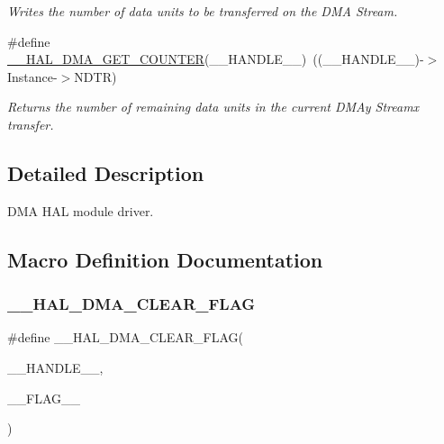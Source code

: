 \begin{DoxyCompactItemize}
\begin{DoxyCompactList}\small\item\em Writes the number of data units to be transferred on the D\+MA Stream. \end{DoxyCompactList}\item 
\#define \mbox{\hyperlink{group___d_m_a_ga082d691311bac96641dc35a17cfe8e63}{\+\_\+\+\_\+\+H\+A\+L\+\_\+\+D\+M\+A\+\_\+\+G\+E\+T\+\_\+\+C\+O\+U\+N\+T\+ER}}(\+\_\+\+\_\+\+H\+A\+N\+D\+L\+E\+\_\+\+\_\+)~((\+\_\+\+\_\+\+H\+A\+N\+D\+L\+E\+\_\+\+\_\+)-\/$>$Instance-\/$>$N\+D\+TR)
\begin{DoxyCompactList}\small\item\em Returns the number of remaining data units in the current D\+M\+Ay Streamx transfer. \end{DoxyCompactList}\end{DoxyCompactItemize}


\subsection{Detailed Description}
D\+MA H\+AL module driver. 



\subsection{Macro Definition Documentation}
\mbox{\label{group___d_m_a_gabc041fb1c85ea7a3af94e42470ef7f2a}} 
\subsubsection{\texorpdfstring{\+\_\+\+\_\+\+H\+A\+L\+\_\+\+D\+M\+A\+\_\+\+C\+L\+E\+A\+R\+\_\+\+F\+L\+AG}{\_\_HAL\_DMA\_CLEAR\_FLAG}}
{\footnotesize\ttfamily \#define \+\_\+\+\_\+\+H\+A\+L\+\_\+\+D\+M\+A\+\_\+\+C\+L\+E\+A\+R\+\_\+\+F\+L\+AG(\begin{DoxyParamCaption}\item[{}]{\+\_\+\+\_\+\+H\+A\+N\+D\+L\+E\+\_\+\+\_\+,  }\item[{}]{\+\_\+\+\_\+\+F\+L\+A\+G\+\_\+\+\_\+ }\end{DoxyParamCaption})}

